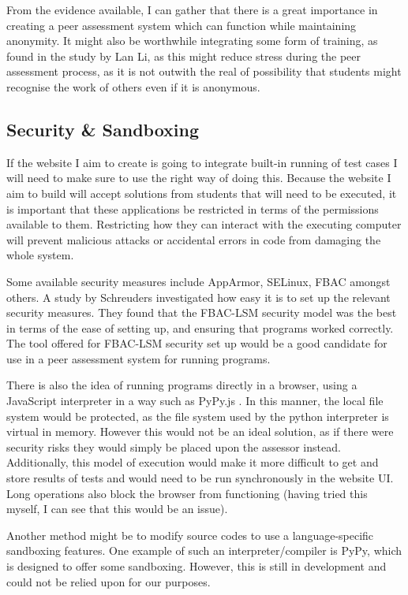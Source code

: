 \documentclass[a4paper,11pt]{report}
\begin{document}
From the evidence available, I can gather that there is a great importance in creating a peer assessment system which can function while maintaining anonymity. It might also be worthwhile integrating some form of training, as found in the study by Lan Li, as this might reduce stress during the peer assessment process, as it is not outwith the real of possibility that students might recognise the work of others even if it is anonymous.

\subsection{Security \& Sandboxing}
\label{subsec:security}
If the website I aim to create is going to integrate built-in running of test cases I will need to make sure to use the right way of doing this. Because the website I aim to build will accept solutions from students that will need to be executed, it is important that these applications be restricted in terms of the permissions available to them. Restricting how they can interact with the executing computer will prevent malicious attacks or accidental errors in code from damaging the whole system.\par
Some available security measures include AppArmor, SELinux, FBAC amongst others. A study by Schreuders \cite{schreuders_empowering_2011} investigated how easy it is to set up the relevant security measures. They found that the FBAC-LSM security model was the best in terms of the ease of setting up, and ensuring that programs worked correctly. The tool offered for FBAC-LSM security set up would be a good candidate for use in a peer assessment system for running programs.\par
There is also the idea of running programs directly in a browser, using a JavaScript interpreter in a way such as PyPy.js \cite{pypy.js_web_2016}. In this manner, the local file system would be protected, as the file system used by the python interpreter is virtual in memory. However this would not be an ideal solution, as if there were security risks they would simply be placed upon the assessor instead. Additionally, this model of execution would make it more difficult to get and store results of tests and would need to be run synchronously in the website UI. Long operations also block the browser from functioning (having tried this myself, I can see that this would be an issue).\par
Another method might be to modify source codes to use a language-specific sandboxing features. One example of such an interpreter/compiler is PyPy\cite{pypy_pypy_2016}, which is designed to offer some sandboxing. However, this is still in development and could not be relied upon for our purposes.\par
\end{document}
